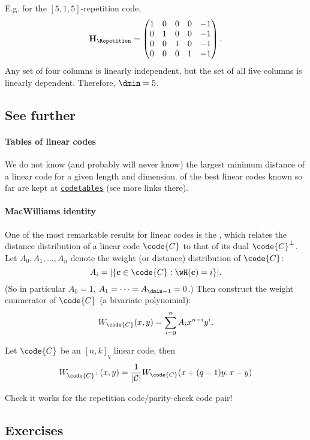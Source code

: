 \documentclass[a4paper, 11pt, openany]{book}
\begin{document}
E.g. for the $[5,1,5]$-repetition code,
\[
	{\bf H}_{\Repetition} = \begin{pmatrix}
	1 & 0 & 0 & 0 & -1\\
	0 & 1 & 0 & 0 & -1\\
	0 & 0 & 1 & 0 & -1\\
	0 & 0 & 0 & 1 & -1
	\end{pmatrix}.
\]
Any set of four columns is linearly independent, but the set of all five columns is linearly dependent. Therefore, $\dmin = 5$.






\subsection{See further}

\paragraph{Tables of linear codes}
We do not know (and probably will never know) the largest minimum distance of a linear code for a given length and dimension.  of the best linear codes known so far are kept at \href{http://www.codetables.de/}{\texttt{codetables}}  (see more links there).

\paragraph{MacWilliams identity}
One of the most remarkable results for linear codes is the , which relates the distance distribution of a linear code $\code{C}$ to that of its dual $\code{C}^\perp$. Let $A_0, A_1, \dots, A_n$ denote the weight (or distance) distribution of $\code{C}$:
\[
    A_i = |\{ {\bf c} \in \code{C} : \wH({\bf c}) = i \}|.
\]
(So in particular $A_0 = 1$, $A_1 = \dots = A_{\dmin  - 1} = 0$.) Then construct the weight enumerator of $\code{C}$ (a bivariate polynomial):
\[
    W_\code{C}(x,y) = \sum_{i=0}^n A_i x^{n-i} y^i.
\]

\begin{theorem}
Let $\code{C}$ be an $[n,k]_q$ linear code, then
\[
     W_{\code{C}^\perp} (x,y) = \frac{1}{|\mathcal{C}|} W_\code{C}(x + (q-1)y, x - y)
\]
\end{theorem}

Check it works for the repetition code/parity-check code pair!

\subsection{Exercises}
\end{document}
